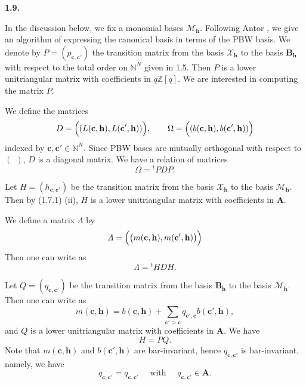 \documentclass[12pt]{amsart}
\newcommand\Om{\Omega}
\newcommand\vL{\varLambda}
\renewcommand{\1}{\mathbb 1}
\newcommand{\ZZ}{\mathbb Z}
\newcommand{\NN}{\mathbb N}
\newcommand\BA{\mathbf A}
\newcommand\bB{\mathbf B}
\newcommand\Bh{\mathbf h}
\newcommand\Bc{\mathbf c}
\newcommand\SM{\mathscr{M}}
\newcommand\SX{\mathscr{X}}
\newcommand\ol{\overline}
\numberwithin{equation}{section}
\def \para#1{\par\medskip\textbf{#1}
              \addtocounter{thm}{1}}
\begin{document}
\para{1.9.}
In the discussion below, we fix a monomial bases $\SM_{\Bh}$.
Following Antor \cite{A}, we give an algorithm of expressing the canonical basis
in terms of the PBW basis.
We denote by $P = (p_{\Bc, \Bc'})$ the transition matrix from
the basis $\SX_{\Bh}$ to the basis $\bB_{\Bh}$ with respect to the total order on $\NN^N$
given in 1.5.
Then $P$ is a lower unitriangular matrix with coefficients in $q\ZZ[q]$.
We are interested in computing the matrix $P$. 
\par
We define the matrices
\begin{align*}
  D = \Bigl((L(\Bc,\Bh), L(\Bc',\Bh))\Bigr),
         \qquad \Om = \Bigl((b(\Bc,\Bh), b(\Bc', \Bh))\Bigr) 
\end{align*}  
indexed by $\Bc, \Bc' \in \NN^N$.  Since PBW bases are mutually orthogonal with respect to
$(\ \ )$, $D$ is a diagonal matrix.
We have a relation of matrices 
\begin{equation*}
\tag{1.9.1}  
\Om = {}^tPDP.
\end{equation*}  

Let $H = (h_{\Bc,\Bc'})$ be the transition matrix from the basis $\SX_{\Bh}$ to the basis 
$\SM_{\Bh}$.  Then by (1.7.1) (ii), $H$ is a lower unitriangular matrix
with coefficients in $\BA$.  
\par
We define a matrix $\vL$ by
\begin{equation*}
\vL = \Bigl(\bigl(m(\Bc,\Bh), m(\Bc',\Bh)\bigr)\Bigr)
\end{equation*}  
Then one can write as
\begin{equation*}
\tag{1.9.2}  
\vL = {}^tHDH.
\end{equation*}

Let $Q = (q_{\Bc,\Bc'})$ be the transition matrix from the basis $\bB_{\Bh}$
to the basis $\SM_{\Bh}$.
Then one can write as 
\begin{equation*}
 m(\Bc, \Bh) = b(\Bc, \Bh) + \sum_{\Bc' > \Bc}q_{\Bc',\Bc}b(\Bc',\Bh),
\end{equation*}  
and $Q$ is a lower unitriangular matrix with coefficients in $\BA$.
We have
\begin{equation*}
\tag{1.9.3}
H = PQ.
\end{equation*}  
Note that $m(\Bc, \Bh)$ and $b(\Bc',\Bh)$ are bar-invariant, hence
$q_{\Bc,\Bc'}$ is bar-invariant, namely, we have
\begin{equation*}
\ol{q_{\Bc,\Bc'}} = q_{\Bc,\Bc'} \quad\text{ with }\quad q_{\Bc,\Bc'} \in \BA.
\end{equation*}  
\end{document}
